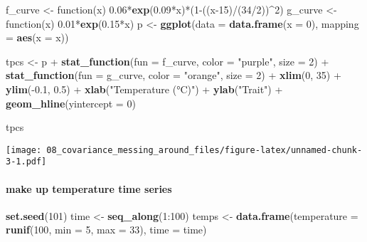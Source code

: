 \documentclass[]{article}
\newenvironment{Shaded}{\begin{snugshade}}{\end{snugshade}}
\newcommand{\KeywordTok}[1]{\textcolor[rgb]{0.13,0.29,0.53}{\textbf{{#1}}}}
\newcommand{\DataTypeTok}[1]{\textcolor[rgb]{0.13,0.29,0.53}{{#1}}}
\newcommand{\DecValTok}[1]{\textcolor[rgb]{0.00,0.00,0.81}{{#1}}}
\newcommand{\FloatTok}[1]{\textcolor[rgb]{0.00,0.00,0.81}{{#1}}}
\newcommand{\StringTok}[1]{\textcolor[rgb]{0.31,0.60,0.02}{{#1}}}
\newcommand{\NormalTok}[1]{{#1}}
\let\oldparagraph\paragraph
\renewcommand{\paragraph}[1]{\oldparagraph{#1}\mbox{}}
\begin{document}
\begin{Shaded}
\begin{Highlighting}[]
\NormalTok{f_curve <-}\StringTok{ }\NormalTok{function(x) }\FloatTok{0.06}\NormalTok{*}\KeywordTok{exp}\NormalTok{(}\FloatTok{0.09}\NormalTok{*x)*(}\DecValTok{1}\NormalTok{-((x}\DecValTok{-15}\NormalTok{)/(}\DecValTok{34}\NormalTok{/}\DecValTok{2}\NormalTok{))^}\DecValTok{2}\NormalTok{)}
\NormalTok{g_curve <-}\StringTok{ }\NormalTok{function(x) }\FloatTok{0.01}\NormalTok{*}\KeywordTok{exp}\NormalTok{(}\FloatTok{0.15}\NormalTok{*x)}
\NormalTok{p <-}\StringTok{ }\KeywordTok{ggplot}\NormalTok{(}\DataTypeTok{data =} \KeywordTok{data.frame}\NormalTok{(}\DataTypeTok{x =} \DecValTok{0}\NormalTok{), }\DataTypeTok{mapping =} \KeywordTok{aes}\NormalTok{(}\DataTypeTok{x =} \NormalTok{x)) }

\NormalTok{tpcs <-}\StringTok{ }\NormalTok{p +}\StringTok{ }
\StringTok{    }\KeywordTok{stat_function}\NormalTok{(}\DataTypeTok{fun =} \NormalTok{f_curve, }\DataTypeTok{color =} \StringTok{"purple"}\NormalTok{, }\DataTypeTok{size =} \DecValTok{2}\NormalTok{) +}
\StringTok{    }\KeywordTok{stat_function}\NormalTok{(}\DataTypeTok{fun =} \NormalTok{g_curve, }\DataTypeTok{color =} \StringTok{"orange"}\NormalTok{, }\DataTypeTok{size =} \DecValTok{2}\NormalTok{) +}
\StringTok{    }\KeywordTok{xlim}\NormalTok{(}\DecValTok{0}\NormalTok{, }\DecValTok{35}\NormalTok{) +}\StringTok{ }\KeywordTok{ylim}\NormalTok{(-}\FloatTok{0.1}\NormalTok{, }\FloatTok{0.5}\NormalTok{) +}\StringTok{ }
\StringTok{    }\KeywordTok{xlab}\NormalTok{(}\StringTok{"Temperature (°C)"}\NormalTok{) +}\StringTok{ }\KeywordTok{ylab}\NormalTok{(}\StringTok{"Trait"}\NormalTok{) +}\StringTok{ }\KeywordTok{geom_hline}\NormalTok{(}\DataTypeTok{yintercept =} \DecValTok{0}\NormalTok{)}

\NormalTok{tpcs}
\end{Highlighting}
\end{Shaded}

\texttt{[image: 08\_covariance\_messing\_around\_files/figure-latex/unnamed-chunk-3-1.pdf]}

\paragraph{make up temperature time
series}\label{make-up-temperature-time-series}

\begin{Shaded}
\begin{Highlighting}[]
\KeywordTok{set.seed}\NormalTok{(}\DecValTok{101}\NormalTok{)}
\NormalTok{time <-}\StringTok{ }\KeywordTok{seq_along}\NormalTok{(}\DecValTok{1}\NormalTok{:}\DecValTok{100}\NormalTok{)}
\NormalTok{temps <-}\StringTok{ }\KeywordTok{data.frame}\NormalTok{(}\DataTypeTok{temperature =} \KeywordTok{runif}\NormalTok{(}\DecValTok{100}\NormalTok{, }\DataTypeTok{min =} \DecValTok{5}\NormalTok{, }\DataTypeTok{max =} \DecValTok{33}\NormalTok{), }\DataTypeTok{time =} \NormalTok{time)}
\end{Highlighting}
\end{Shaded}
\end{document}
